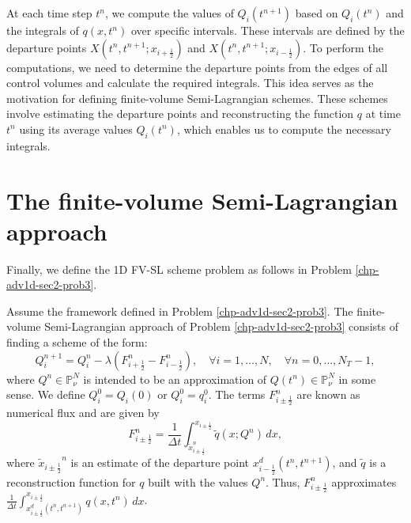 At each time step $t^n$, we compute the values of ${Q}_i(t^{n+1})$ based on ${Q}_i(t^{n})$ and the integrals 
of $q(x, t^n)$ over specific intervals. These intervals are defined by the departure points 
$X(t^n, t^{n+1}; x_{i+\frac{1}{2}})$ and $X(t^n, t^{n+1}; x_{i-\frac{1}{2}})$.
To perform the computations, we need to determine the departure points from the edges of all control volumes
and calculate the required integrals. This idea serves as the motivation for defining finite-volume 
Semi-Lagrangian schemes. These schemes involve estimating the departure points and reconstructing the 
function $q$ at time $t^n$ using its average values $Q_i(t^n)$, which enables us to compute the necessary integrals.

\section{The finite-volume Semi-Lagrangian approach}
\label{chp-adv1d-sec2-fvsl}
Finally, we define the 1D FV-SL scheme problem as follows in Problem \ref{chp-adv1d-sec2-prob3}.
\begin{prob}[1D FV-SL scheme]
	\label{chp-adv1d-sec2-prob4}
	Assume the framework defined in Problem \ref{chp-adv1d-sec2-prob3}.
	The finite-volume Semi-Lagrangian approach of Problem \ref{chp-adv1d-sec2-prob3}
	consists of finding a scheme of the form:
	\begin{equation}
		\label{1d-fv-scheme}
		{Q}_{i}^{n+1} = {Q}_{i}^{n} -
		\lambda({F}_{i+\frac{1}{2}}^{n} - {F}_{i-\frac{1}{2}}^{n}),
		\quad \forall i = 1, \ldots, N,
		\quad \forall n = 0, \ldots, N_T-1,
	\end{equation}
	where ${Q}^{n} \in \mathbb{P}^{N}_{\nu}$ is intended to be an approximation
	of ${Q}(t^{n})\in \mathbb{P}^{N}_{\nu}$ in some sense. We define
	${Q}_{i}^{0} = {Q}_i(0)$ or ${Q}_{i}^{0} = {q}^{0}_{i}$.
	The terms ${F}_{i\pm\frac{1}{2}}^{n}$ are known as numerical flux and are given by
	\begin{equation}
		{F}_{i\pm\frac{1}{2}}^{n} =
		\frac{1}{\Delta t}
		\int_{\tilde{x}_{i\pm\frac{1}{2}}^n}^{x_{i\pm\frac{1}{2}}}\tilde{q}(x; Q^n) \,dx,
	\end{equation}
	where ${\tilde{x}_{i\pm\frac{1}{2}}}^n$ is an estimate of the departure point $x_{i-\frac{1}{2}}^d(t^n,t^{n+1})$,
	and $\tilde{q}$ is a reconstruction function for $q$ built with the values $Q^n$.
	Thus, ${F}_{i\pm\frac{1}{2}}^{n}$ approximates
	$\frac{1}{\Delta t} \int_{x_{i\pm\frac{1}{2}}^d(t^n,t^{n+1})}^{x_{i\pm \frac{1}{2}}}{q}(x, t^n) \,dx$.
\end{prob}
